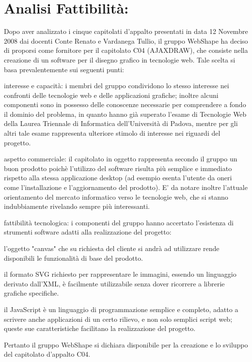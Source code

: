\section{Analisi Fattibilit\`{a}:}
\indent \indent
Dopo aver analizzato i cinque capitolati d'appalto presentati in data 12 Novembre 2008 
dai docenti Conte Renato e Vardanega Tullio, il gruppo WebShape ha deciso di proporsi come 
fornitore per il capitolato C04 (AJAXDRAW), che consiste nella creazione di un software 
per il disegno grafico in tecnologie web.
Tale scelta si basa prevalentemente sui seguenti punti:
	\begin{elenconumerato}{\normindent}
		\item interesse e capacit\`{a}: i membri del gruppo condividono lo stesso interesse nei confronti delle tecnologie web e delle applicazioni grafiche; inoltre alcuni componenti sono in possesso delle conoscenze necessarie per comprendere a fondo il dominio del problema, in quanto hanno gi\`{a} superato l'esame di Tecnologie Web della Laurea Triennale di Informatica dell'Universit\`{a} di Padova, mentre per gli altri tale esame rappresenta ulteriore stimolo di interesse nei riguardi del progetto.
		\item aspetto commerciale: il capitolato in oggetto rappresenta secondo il gruppo un buon prodotto 
		poich\`{e} l'utilizzo del software risulta pi\`{u}  semplice e immediato rispetto alla stessa applicazione desktop	(ad esempio esenta l'utente da oneri come l'installazione e l'aggiornamento del prodotto).
		E' da notare inoltre l'attuale orientamento del mercato informatico verso le tecnologie web, 
		che si stanno indubbiamente rivelando sempre pi\`{u} interessanti.
		\item fattibilit\`{a} tecnologica: i componenti del gruppo hanno accertato l'esistenza di strumenti software adatti alla realizzazione del progetto: 
				\begin{elencopuntato}[\normindent]
					\item l'oggetto "canvas" che su richiesta del cliente si andr\`a ad utilizzare rende disponibili le funzionalit\`a di base del prodotto.
					\item il formato SVG richiesto per rappresentare le immagini, essendo un linguaggio derivato dall'XML, \`e facilmente utilizzabile senza dover ricorrere a librerie grafiche specifiche.
					\item il JavaScript \`e un linguaggio di programmazione semplice e completo, adatto a scrivere anche applicazioni di un certo rilievo, e non solo semplici script web; queste sue caratteristiche facilitano la realizzazione del progetto.
				\end{elencopuntato}
\end{elenconumerato}

Pertanto il gruppo WebShape si dichiara disponibile per la creazione e lo sviluppo del capitolato d'appalto C04.


